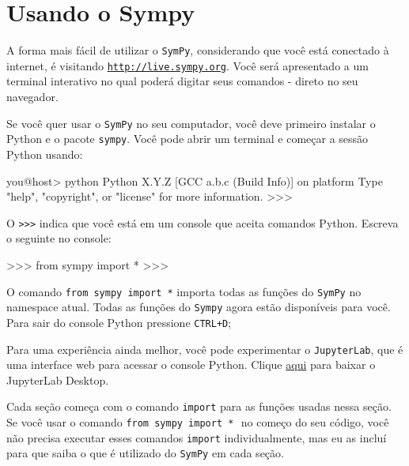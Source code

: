 \section*{Usando o \textbf{Sympy}}
\label{sec:sympytut_using_sympy}

A forma mais fácil de utilizar o \texttt{SymPy}, considerando que você está conectado à internet, é visitando \href{http://live.sympy.org}{\texttt{http://live.sympy.org}}. Você será apresentado a um terminal interativo no qual poderá digitar seus comandos - direto no seu navegador.

Se você quer usar o \texttt{SymPy} no seu computador, você deve primeiro instalar o Python e o pacote \texttt{sympy}. Você pode abrir um terminal e começar a sessão Python usando:

\small
\begin{verbatimtab}
you@host> python
Python X.Y.Z 
[GCC a.b.c (Build Info)] on platform
Type "help", "copyright", or "license" for more information.
>>> 
\end{verbatimtab}
\normalsize

\noindent
O \texttt{>{}>{}>} indica que você está em um console que aceita comandos Python. Escreva o seguinte no console:

\small
\begin{verbatimtab}
>>> from sympy import *
>>> 
\end{verbatimtab}
\normalsize

\noindent

O comando \texttt{from sympy import *} importa todas as funções do \texttt{SymPy} no namespace atual. Todas as funções do \texttt{Sympy} agora estão disponíveis para você. Para sair do console Python pressione \texttt{CTRL+D};

Para uma experiência ainda melhor, você pode experimentar o \texttt{JupyterLab}, que é uma interface web para acessar o console Python. Clique \href{https://github.com/jupyterlab/jupyterlab-desktop#jupyterlab-desktop}{aqui} para baixar o JupyterLab Desktop. 

Cada seção  começa com o comando \texttt{import} para as funções usadas nessa seção. Se você usar o comando \texttt{from sympy import *}\,\, no começo do seu código, você não precisa executar esses comandos \texttt{import} individualmente, mas eu as incluí para que saiba o que é utilizado do \texttt{SymPy} em cada seção.


